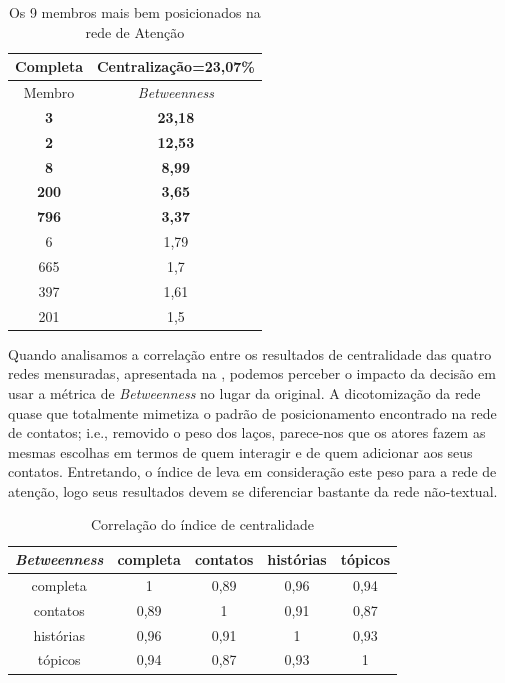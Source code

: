 \begin{table}[htbp]
	\large       %
	\setlength{\arrayrulewidth}{2\arrayrulewidth}  %
	\setlength{\belowcaptionskip}{10pt}  %
	\caption{Os 9 membros mais bem posicionados na rede de Atenção} \centering   
	\begin{tabular}{| c | c |}
	\hline
	Completa & Centralização=23,07\% \\ \hline\hline
	Membro & \emph{Betweenness} \\ \hline
	\textbf{3} & \textbf{23,18} \\
	\textbf{2} & \textbf{12,53} \\
	\textbf{8} & \textbf{8,99} \\
	\textbf{200} & \textbf{3,65} \\
	\textbf{796} & \textbf{3,37} \\
	6 & 1,79 \\
	665 & 1,7 \\
	397 & 1,61 \\
	201 & 1,5 \\\hline
	\end{tabular}
	\label{ap:tab:cent-completa}
\end{table}

Quando analisamos a correlação entre os resultados de centralidade das quatro
redes mensuradas, apresentada na , podemos perceber o
impacto da decisão em usar a métrica de \emph{Betweenness} no lugar da original.
A dicotomização da rede quase que totalmente mimetiza o padrão de posicionamento
encontrado na rede de contatos; i.e., removido o peso dos laços, parece-nos que
os atores fazem as mesmas escolhas em termos de quem interagir e de quem
adicionar aos seus contatos. Entretando, o índice de \citeauthor{Bonacich1987}
leva em consideração este peso para a rede de atenção, logo seus resultados
devem se diferenciar bastante da rede não-textual.

\begin{table}[htbp]
	\large       %
	\setlength{\arrayrulewidth}{2\arrayrulewidth}  %
	\setlength{\belowcaptionskip}{10pt}  %
	\caption{Correlação do índice de centralidade} \centering   
	\begin{tabular}{| c | c c c c|}
	\hline
	\emph{Betweenness} & completa & contatos & histórias & tópicos \\ \hline
	completa & 1 & 0,89 & 0,96 & 0,94 \\
	contatos & 0,89 & 1 & 0,91 & 0,87 \\
	histórias & 0,96 & 0,91 & 1 & 0,93 \\
	tópicos & 0,94 & 0,87 & 0,93 & 1 \\\hline
	\end{tabular}
	\label{ap:tab:cent-corr}
\end{table}

